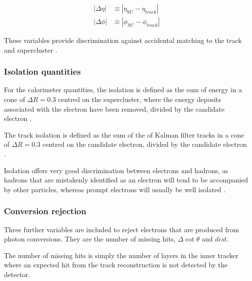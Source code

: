 \begin{align}
|\Delta\eta| &\equiv |\eta_{\text{SC}} - \eta_{track}|\\
|\Delta\phi| &\equiv |\phi_{\text{SC}} - \phi_{track}|
\end{align}

These variables provide discrimination against accidental matching to the track and
supercluster \cite{baffioni2009identification}. 


\subsubsection{Isolation quantities}
For the calorimeter quantities, the isolation is defined as the sum of energy in
a cone of $\Delta R = 0.3$ centred on the supercluster, where the energy
deposits associated with the electron have been removed, divided by the
candidate electron \Pt.

The track isolation is defined as the sum of the \Pt of Kalman filter tracks in
a cone of $\Delta R = 0.3 $ centred on the candidate electron, divided by the
candidate electron \Pt.

Isolation offers very good discrimination between electrons and hadrons, as
hadrons that are mistakenly identified as an electron will tend to be
accompanied by other particles, whereas prompt electrons will usually be well
isolated \cite{baffioni2009identification,nikos}.

\subsubsection{Conversion rejection}
Three further variables are included to reject electrons that are produced from
photon conversions. They are the number of missing hits, $\Delta\cot\theta$ and
$dist$. 

The number of missing hits is simply the number of layers in the inner
tracker where an expected hit from the track reconstruction is not detected by
the detector.

